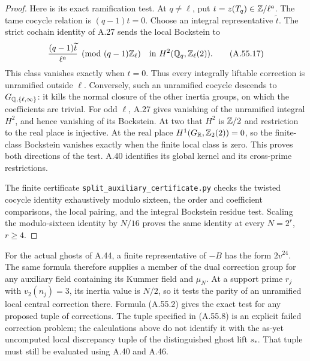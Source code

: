 \begin{proof}
Here is its exact ramification test.  At $q\ne\ell$, put
$t=z(T_q)\in\mathbb Z/\ell^a$.  The tame cocycle relation is
$(q-1)t=0$.  Choose an integral representative $\widetilde t$.
The strict cochain identity of A.27 sends the local Bockstein
to
\[
       \frac{(q-1)\widetilde t}{\ell^a}
                    \pmod{(q-1)\mathbb Z_\ell}
       \quad\hbox{in }H^2(\mathbb Q_q,\mathbb Z_\ell(2)).
 \tag{A.55.17}
\]
This class vanishes exactly when $t=0$.  Thus every
integrally liftable correction is unramified outside $\ell$.
Conversely, such an unramified cocycle descends to
$G_{\mathbb Q,\{\ell,\infty\}}$: it kills the normal closure of
the other inertia groups, on which the coefficients are
trivial.  For odd $\ell$, A.27 gives vanishing of the
unramified integral $H^2$, and hence vanishing of its
Bockstein.  At two that $H^2$ is $\mathbb Z/2$ and restriction
to the real place is injective.  At the real place
$H^1(G_\mathbb R,\mathbb Z_2(2))=0$, so the finite-class Bockstein
vanishes exactly when the finite local class is zero.
This proves both directions of the test.  A.40 identifies
its global kernel and its cross-prime restrictions.

The finite certificate
\texttt{split\_auxiliary\_certificate.py} checks the
twisted cocycle identity exhaustively modulo sixteen,
the order and coefficient comparisons, the local pairing,
and the integral Bockstein residue test.  Scaling the
modulo-sixteen identity by $N/16$ proves the same identity
at every $N=2^r$, $r\ge4$.
\end{proof}

For the actual ghosts of A.44, a finite representative of
$-B$ has the form $2v^{24}$.  The same formula therefore
supplies a member of the dual correction group for any
auxiliary field containing its Kummer field and $\mu_N$.
At a support prime $r_j$ with $v_2(n_j)=3$, its inertia
value is $N/2$, so it tests the parity of an unramified
local central correction there.  Formula (A.55.2) gives
the exact test for any proposed tuple of corrections.
The tuple specified in (A.55.8) is an explicit failed
correction problem; the calculations above do not identify
it with the as-yet uncomputed local discrepancy tuple of
the distinguished ghost lift $s_*$.  That tuple must still
be evaluated using A.40 and A.46.

